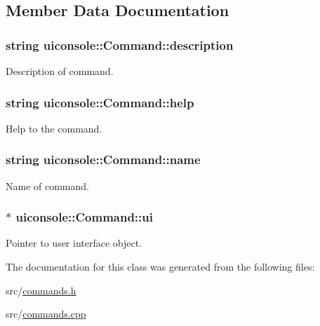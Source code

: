 \subsection{Member Data Documentation}
\hypertarget{classuiconsole_1_1Command_ad6dbdcec778315e395a8be8571c3c69d}{
\subsubsection[{description}]{\setlength{\rightskip}{0pt plus 5cm}string {\bf uiconsole::Command::description}}}
\label{dc/df0/classuiconsole_1_1Command_ad6dbdcec778315e395a8be8571c3c69d}
Description of command. \hypertarget{classuiconsole_1_1Command_adcc2a70ee67fa5040e6fce1508c490d2}{
\subsubsection[{help}]{\setlength{\rightskip}{0pt plus 5cm}string {\bf uiconsole::Command::help}}}
\label{dc/df0/classuiconsole_1_1Command_adcc2a70ee67fa5040e6fce1508c490d2}
Help to the command. \hypertarget{classuiconsole_1_1Command_a61eae0502f93a95a9434835f5c72d999}{
\subsubsection[{name}]{\setlength{\rightskip}{0pt plus 5cm}string {\bf uiconsole::Command::name}}}
\label{dc/df0/classuiconsole_1_1Command_a61eae0502f93a95a9434835f5c72d999}
Name of command. \hypertarget{classuiconsole_1_1Command_ab43ed5152860c099f858d62f9f556699}{
\subsubsection[{ui}]{$\ast$ {\bf uiconsole::Command::ui}}}
\label{dc/df0/classuiconsole_1_1Command_ab43ed5152860c099f858d62f9f556699}
Pointer to user interface object. 

The documentation for this class was generated from the following files:\begin{DoxyCompactItemize}
\item 
src/\hyperlink{commands_8h}{commands.h}\item 
src/\hyperlink{commands_8cpp}{commands.cpp}\end{DoxyCompactItemize}
